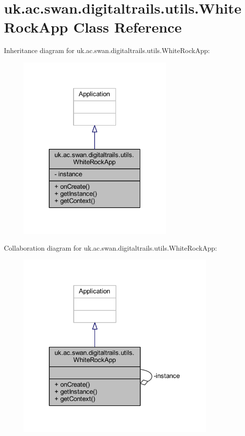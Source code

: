 \hypertarget{classuk_1_1ac_1_1swan_1_1digitaltrails_1_1utils_1_1_white_rock_app}{\section{uk.\+ac.\+swan.\+digitaltrails.\+utils.\+White\+Rock\+App Class Reference}
\label{classuk_1_1ac_1_1swan_1_1digitaltrails_1_1utils_1_1_white_rock_app}
}


Inheritance diagram for uk.\+ac.\+swan.\+digitaltrails.\+utils.\+White\+Rock\+App\+:
\nopagebreak
\begin{figure}[H]
\begin{center}
\leavevmode
\includegraphics[width=220pt]{classuk_1_1ac_1_1swan_1_1digitaltrails_1_1utils_1_1_white_rock_app__inherit__graph}
\end{center}
\end{figure}


Collaboration diagram for uk.\+ac.\+swan.\+digitaltrails.\+utils.\+White\+Rock\+App\+:
\nopagebreak
\begin{figure}[H]
\begin{center}
\leavevmode
\includegraphics[width=281pt]{classuk_1_1ac_1_1swan_1_1digitaltrails_1_1utils_1_1_white_rock_app__coll__graph}
\end{center}
\end{figure}
